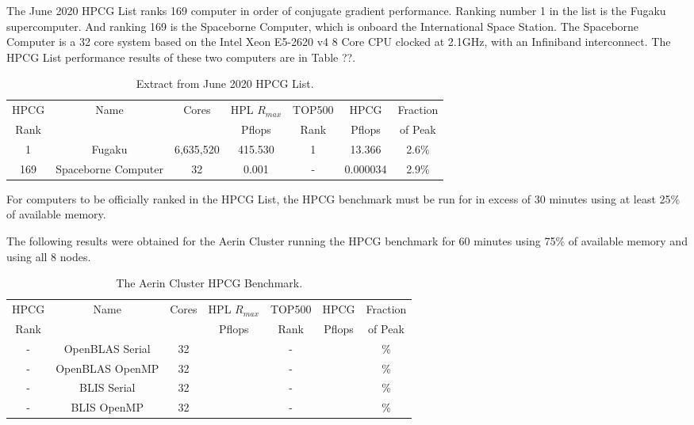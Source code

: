 The June 2020 HPCG List ranks 169 computer in order of conjugate gradient performance. Ranking number 1 in the list is the Fugaku supercomputer. And ranking 169 is the Spaceborne Computer, which is onboard the International Space Station. The Spaceborne Computer is a 32 core system based on the Intel Xeon E5-2620 v4 8 Core CPU clocked at 2.1GHz, with an Infiniband interconnect. The HPCG List performance results of these two computers are in Table ??.

\begin{table}[H]
\begin{center}
\begin{tabular}{ |c|c|c|c|c|c|c| } 
\hline
HPCG & Name & Cores & HPL $R_{max}$ & TOP500 & HPCG   & Fraction \\
Rank &      &       & Pflops        & Rank   & Pflops & of Peak  \\
\hline
1 & Fugaku & 6,635,520 & 415.530 & 1 & 13.366 & 2.6\% \\
\hline
169 & Spaceborne Computer & 32 & 0.001 & - & 0.000034 & 2.9\% \\
\hline
\end{tabular}
\end{center}
\caption{\label{tab:table-name}Extract from June 2020 HPCG List.}
\end{table}

For computers to be officially ranked in the HPCG List, the HPCG benchmark must be run for in excess of 30 minutes using at least 25\% of available memory.

The following results were obtained for the Aerin Cluster running the HPCG benchmark for 60 minutes using 75\% of available memory and using all 8 nodes.

\begin{table}[H]
\begin{center}
\begin{tabular}{ |c|c|c|c|c|c|c| }
\hline
HPCG & Name & Cores & HPL $R_{max}$ & TOP500 & HPCG   & Fraction \\
Rank &      &       & Pflops        & Rank   & Pflops & of Peak  \\
\hline
- & OpenBLAS Serial & 32 & & - & & \% \\
\hline
- & OpenBLAS OpenMP & 32 & & - & & \% \\
\hline
- & BLIS Serial & 32 & & - & & \% \\
\hline
- & BLIS OpenMP & 32 & & - & & \% \\
\hline
\end{tabular}
\end{center}
\caption{\label{tab:table-name}The Aerin Cluster HPCG Benchmark.}
\end{table}



